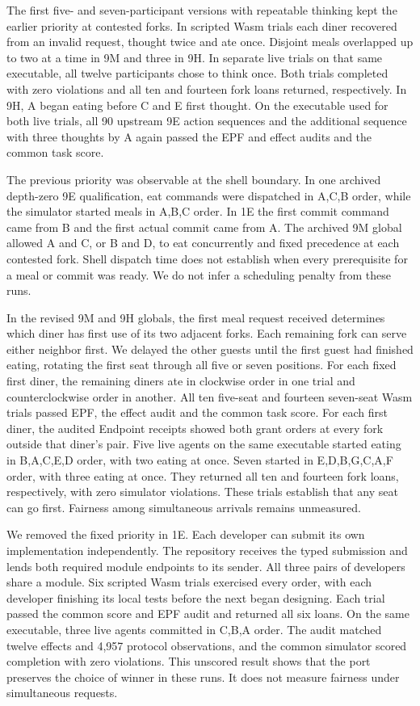 \documentclass[10pt]{article}
\begin{document}
The first five- and seven-participant versions with repeatable thinking
kept the earlier priority at contested forks. In scripted Wasm trials each diner recovered from an
invalid request, thought twice and ate once. Disjoint meals overlapped up to
two at a time in 9M and three in 9H. In separate live trials on that same
executable, all twelve participants chose to think once. Both trials completed
with zero violations and all ten and fourteen fork loans returned, respectively.
In 9H, A began eating before C and E first thought. On the executable used for both
live trials, all 90 upstream 9E action sequences and the additional sequence
with three thoughts by A again passed the EPF and effect audits and the common
task score.

The previous priority was observable at the shell boundary. In one archived depth-zero 9E
qualification, eat commands were dispatched in A,C,B order, while the simulator
started meals in A,B,C order. In 1E the first commit command came from B and
the first actual commit came from A. The archived 9M global allowed A and C,
or B and D, to eat concurrently and fixed precedence at each contested fork. Shell
dispatch time does not establish when every prerequisite for a meal or commit
was ready. We do not infer a scheduling penalty from these runs.

In the revised 9M and 9H globals, the first meal request received determines
which diner has first use of its two adjacent forks. Each remaining fork can
serve either neighbor first. We delayed the other guests until the first
guest had finished eating, rotating the first seat through all five or seven
positions. For each fixed first diner, the remaining diners ate in clockwise
order in one trial and counterclockwise order in another. All ten five-seat
and fourteen seven-seat Wasm trials passed EPF, the effect audit and the
common task score. For each first diner, the audited Endpoint receipts showed
both grant orders at every fork outside that diner's pair. Five live agents
on the same executable started eating in B,A,C,E,D order, with two eating at
once. Seven started in E,D,B,G,C,A,F order, with three eating at once. They
returned all ten and fourteen fork loans, respectively, with zero simulator
violations. These trials establish that any seat can go first. Fairness among
simultaneous arrivals remains unmeasured.

We removed the fixed priority in 1E. Each developer can submit its own
implementation independently. The repository receives the typed submission
and lends both required module endpoints to its sender. All three pairs of
developers share a module. Six scripted Wasm trials exercised every order,
with each developer finishing its local tests before the next began designing.
Each trial passed the common score and EPF audit and returned all six loans.
On the same executable, three live agents committed in C,B,A order. The
audit matched twelve effects and 4,957 protocol observations, and the common
simulator scored completion with zero violations. This unscored result shows
that the port preserves the choice of winner in these runs. It does not
measure fairness under simultaneous requests.
\end{document}
